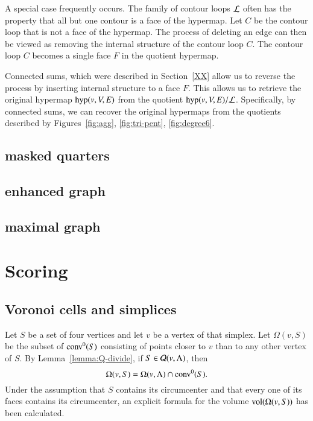 A special case frequently occurs.  The family of contour loops
$\cal L$ often has the property that all but one contour is
a face of the hypermap.  Let $C$ be the contour loop that
is not a face of the hypermap.  The process of deleting an
edge can then be viewed as removing the internal structure
of the contour loop $C$.  The contour loop $C$ becomes a single
face $F$ in the quotient hypermap.

Connected sums, which were described in Section~\ref{XX} allow
us to reverse the process by inserting internal structure to
a face $F$.  This allows us to retrieve the original hypermap
${\operatorname{hyp}}(v,V,E)$
from the quotient
${\operatorname{hyp}}(v,V,E)/{\cal L}$.  Specifically, by connected sums, we can recover
the original hypermaps from the quotients described by
Figures~\ref{fig:agg}, \ref{fig:tri-pent}, \ref{fig:degree6}.

\subsection{masked quarters}



\subsection{enhanced graph}
\subsection{maximal graph}

\section{Scoring}





\subsection{Voronoi cells and simplices}


Let $S$ be a set of four vertices and let $v$ be a vertex of that simplex. Let
$\Omega(v,S)$ be the subset of ${\operatorname{conv}}^0(S)$ consisting of points closer
to $v$ than to any other vertex of $S$. By
Lemma~\ref{lemma:Q-divide}, if $S\in{\mathcal Q}(v,\Lambda)$, then
$$\Omega(v,S) = \Omega(v,\Lambda)\cap{\operatorname{conv}}^0(S).$$
Under the assumption that $S$ contains its circumcenter and that
every one of its faces contains its circumcenter, an explicit
formula for the volume ${\operatorname{vol}}(\Omega(v,S))$ has been
calculated.  %


